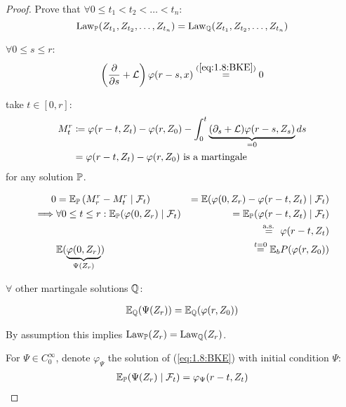 \begin{proof}
    Prove that $\forall 0\leq t_1<t_2<\dots<t_n$:
    \[\text{Law}_{\mathbb{P}}(Z_{t_1},Z_{t_2},\dots,Z_{t_n})=\text{Law}_{\mathbb{Q}}(Z_{t_1},Z_{t_2},\dots,Z_{t_n})\]


    $\forall 0\leq s\leq r$: 
    \begin{align*}
        \left(\frac{\partial}{\partial s}+\mathcal{L}\right)\varphi(r-s,x)\stackrel{(\ref{eq:1.8:BKE})}{=}0
    \end{align*}

    take $t\in[0,r]$: 
    \begin{align*}
        M_t^r&\coloneqq \varphi(r-t,Z_t)-\varphi(r,Z_0)-\int_0^t\underbrace{(\partial_s+\mathcal{L})\varphi(r-s,Z_s)}_{=0}ds\\
        &=\varphi(r-t,Z_t)-\varphi(r,Z_0)\text{ is a martingale}
    \end{align*}
    for any solution $\mathbb{P}$. 

    \begin{eqnarray*}
        0&=\mathbb{E}_{\mathbb{P}}\left(M_r^r-M_t^r\mid\mathcal{F}_t \right) &= \mathbb{E}(\varphi(0,Z_r)-\varphi(r-t,Z_t)\mid \mathcal{F}_t)\\
        \implies &\forall 0\leq t\leq r: \mathbb{E}_{\mathbb{P}}(\varphi(0,Z_r)\mid\mathcal{F}_t)&=\mathbb{E}_{\mathbb{P}}(\varphi(r-t,Z_t)\mid\mathcal{F}_t)\\
        &&\stackrel{\text{ a.s. }}{=}\varphi(r-t,Z_t)\\
        &\mathbb{E}(\underbrace{\varphi(0,Z_r)}_{\Psi(Z_r)})&\stackrel{t=0}{=}\mathbb{E}_bP(\varphi(r,Z_0))
    \end{eqnarray*}

    $\forall $ other martingale solutions $\mathbb{Q}$:

    \begin{eqnarray*}
        \mathbb{E}_{\mathbb{Q}}(\Psi(Z_r))=\mathbb{E}_{\mathbb{Q}}(\varphi(r,Z_0))
    \end{eqnarray*}

    By assumption this implies $\text{Law}_{\mathbb{P}}(Z_r)=\text{Law}_{\mathbb{Q}}(Z_r)$.


    For $\Psi\in C_0^\infty$, denote $\varphi_\Psi$ the solution of (\ref{eq:1.8:BKE}) with initial condition $\Psi$:
    \begin{eqnarray*}
        \mathbb{E}_{\mathbb{P}}(\Psi(Z_r)\mid \mathcal{F}_t)=\varphi_\Psi(r-t,Z_t)
    \end{eqnarray*}


\end{proof}
